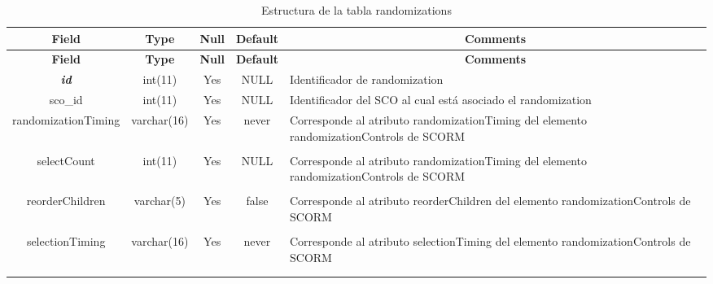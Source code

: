 %
%
\begin{longtable}{c c c c l}
	\multicolumn{1}{c}{\textbf{Field}} &
	\multicolumn{1}{c}{\textbf{Type}} &
	\multicolumn{1}{c}{\textbf{Null}} &
	\multicolumn{1}{c}{\textbf{Default}} &
	\multicolumn{1}{c}{\textbf{Comments}} \\ \hline \hline
\endfirsthead
	\multicolumn{1}{c}{\textbf{Field}} &
	\multicolumn{1}{c}{\textbf{Type}} &
	\multicolumn{1}{c}{\textbf{Null}} &
	\multicolumn{1}{c}{\textbf{Default}} &
	\multicolumn{1}{c}{\textbf{Comments}} \\ \hline \hline
\endhead \endfoot
	\textbf{\textit{id}} & int(11)  & Yes & NULL & \parbox[t]{0.35\textwidth}{Identificador de randomization}\\ \hline 
	sco\_id & int(11) & Yes & NULL & \parbox[t]{0.35\textwidth}{Identificador del SCO al cual está asociado el randomization}\\ \hline 
	randomizationTiming & varchar(16) & Yes & never & \parbox[t]{0.35\textwidth}{Corresponde al atributo randomizationTiming del elemento randomizationControls de SCORM } \\ \\  \hline
	selectCount & int(11)  & Yes & NULL & \parbox[t]{0.35\textwidth}{Corresponde al atributo randomizationTiming del elemento randomizationControls de SCORM} \\ \\  \hline
	reorderChildren & varchar(5) & Yes & false & \parbox[t]{0.35\textwidth}{Corresponde al atributo reorderChildren del elemento randomizationControls de SCORM} \\ \\  \hline
	selectionTiming & varchar(16) & Yes & never & \parbox[t]{0.35\textwidth}{Corresponde al atributo selectionTiming del elemento randomizationControls de SCORM} \\ \\  \hline
 \caption{Estructura de la tabla randomizations} \label{tab:scorm_randomizations-structure} \\
\end{longtable}

